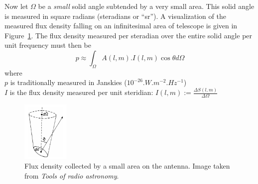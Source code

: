 \documentclass[a4paper,10pt]{report}
\begin{document}
Now let $\Omega$ be a \textit{small} solid angle subtended by a very small area. This solid angle is measured in square radians (steradians or ``sr''). A visualization 
of the measured flux density falling on an infinitesimal area of telescope is given in Figure~\ref{fig_measuring_source_brightness}. The flux density measured 
per steradian over the entire solid angle per unit frequency must then be 
  \begin{equation}
    p \approx \int_{\Omega}{A(l,m).I(l,m)\cos{\theta}d\Omega}
    \label{REF_EQN_SINGLE_ANTENNA}
  \end{equation}
where\\
  $p$ is traditionally measured in Janskies ($10^{-26}.W.m^{-2}.Hz^{-1}$)\\
  $I$ is the flux density measured per unit steridian: $I(l,m) := \frac{\Delta S(l,m)}{\Delta\Omega}$\\
\begin{figure}[ht]
\begin{mdframed}
 \centering
 \includegraphics[width=0.2\textwidth]{images/measuring_source_brightness.png}
 \caption[Source brightness]{Flux density collected by a small area on the antenna. Image taken from \textit{Tools of radio astronomy}\cite{wilson2009tools}.}
 \label{fig_measuring_source_brightness}
\end{mdframed}
\end{figure}
\end{document}
